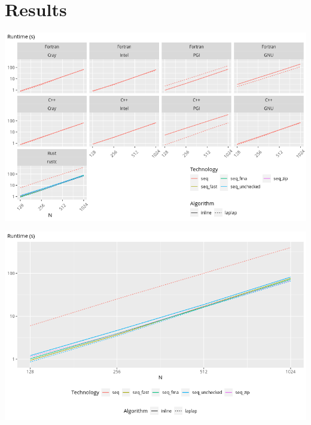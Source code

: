 \documentclass[aspectratio=43, t]{beamer}
\begin{document}
\section*{Results}
\begin{frame}
	\centering
	\includegraphics[width = \textwidth, height = \textheight, keepaspectratio]{scaling_seq.png}
	\par
\end{frame}

\begin{frame}
	\centering
	\includegraphics[width = \textwidth, height = \textheight, keepaspectratio]{scaling_seq_rust.png}
	\par
\end{frame}
\end{document}
